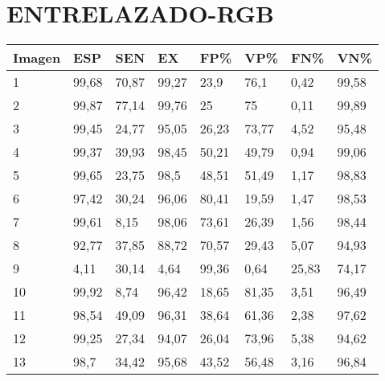 \section{ENTRELAZADO-RGB}
\begin{longtable}[c]{|l|l|l|l|l|l|l|l|}
\hline
\textbf{Imagen} & \textbf{ESP} & \textbf{SEN} & \textbf{EX} & \textbf{FP\%} & \textbf{VP\%} & \textbf{FN\%} & \textbf{VN\%} \\ \hline
\endfirsthead
%
\endhead
%
1               & 99,68        & 70,87        & 99,27       & 23,9          & 76,1          & 0,42          & 99,58         \\ \hline
2               & 99,87        & 77,14        & 99,76       & 25            & 75            & 0,11          & 99,89         \\ \hline
3               & 99,45        & 24,77        & 95,05       & 26,23         & 73,77         & 4,52          & 95,48         \\ \hline
4               & 99,37        & 39,93        & 98,45       & 50,21         & 49,79         & 0,94          & 99,06         \\ \hline
5               & 99,65        & 23,75        & 98,5        & 48,51         & 51,49         & 1,17          & 98,83         \\ \hline
6               & 97,42        & 30,24        & 96,06       & 80,41         & 19,59         & 1,47          & 98,53         \\ \hline
7               & 99,61        & 8,15         & 98,06       & 73,61         & 26,39         & 1,56          & 98,44         \\ \hline
8               & 92,77        & 37,85        & 88,72       & 70,57         & 29,43         & 5,07          & 94,93         \\ \hline
9               & 4,11         & 30,14        & 4,64        & 99,36         & 0,64          & 25,83         & 74,17         \\ \hline
10              & 99,92        & 8,74         & 96,42       & 18,65         & 81,35         & 3,51          & 96,49         \\ \hline
11              & 98,54        & 49,09        & 96,31       & 38,64         & 61,36         & 2,38          & 97,62         \\ \hline
12              & 99,25        & 27,34        & 94,07       & 26,04         & 73,96         & 5,38          & 94,62         \\ \hline
13              & 98,7         & 34,42        & 95,68       & 43,52         & 56,48         & 3,16          & 96,84         \\ \hline

\end{longtable}
